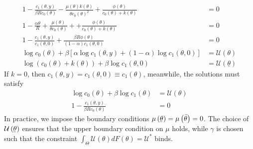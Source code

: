 \documentclass[11pt]{article}
\newcommand{\ubar}[1]{\underaccent{\bar}{#1}}
\begin{document}
\begin{align*}
    1-\frac{c_{1}\left(\theta,y\right)}{\beta Rc_{0}\left(\theta\right)}-\frac{\mu\left(\theta\right)k\left(\theta\right)}{\theta c_{0}\left(\theta\right)^{2}}+\frac{\phi\left(\theta\right)}{c_{0}\left(\theta\right)+k\left(\theta\right)}&=0\\1-\frac{\alpha\theta}{R}+\frac{\mu\left(\theta\right)}{\theta c_{0}\left(\theta\right)}++\frac{\phi\left(\theta\right)}{c_{0}\left(\theta\right)+k\left(\theta\right)}&=0\\1-\frac{c_{1}\left(\theta,y\right)}{c_{1}\left(\theta,0\right)}+\frac{\beta R\phi\left(\theta\right)}{\left(1-\alpha\right)c_{1}\left(\theta,0\right)}&=0\\\log c_{0}\left(\theta\right)+\beta\left[\alpha\log c_{1}\left(\theta,y\right)+\left(1-\alpha\right)\log c_{1}\left(\theta,0\right)\right]&=\mathcal{U}\left(\theta\right)\\\log\left(c_{0}\left(\theta\right)+k\left(\theta\right)\right)+\beta\log c_{1}\left(\theta,0\right)&=\mathcal{U}\left(\underline{\theta}\right)
\end{align*}
If \( k=0 \), then \( c_1\left( \theta,y \right) = c_1\left( \theta,0 \right)\equiv c_1\left( \theta \right) \), meanwhile, the solutions must satisfy 
\begin{align*}
    \log c_{0}\left(\theta\right)+\beta\log c_{1}\left(\theta\right)&=\mathcal{U}\left(\theta\right)\\1-\frac{c_{1}\left(\theta,y\right)}{\beta Rc_{0}\left(\theta\right)}&=0
\end{align*}
In practice, we impose the boundary conditions \( \mu\left( \ubar{\theta} \right) = \mu\left( \bar{\theta} \right) = 0 \). The choice of \( \mathcal{U}\left( \ubar{\theta} \right) \) ensures that the upper boundary condition on \( \mu \) holds, while \( \gamma \) is chosen such that the constraint \( \int_\Theta\mathcal{U}\left( \theta \right)dF\left( \theta \right) = \mathcal{U}^* \) binds.
\end{document}
